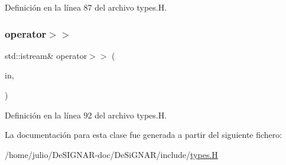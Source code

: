 Definición en la línea 87 del archivo types.\+H.

\mbox{\label{class_designar_1_1_empty_class_aa3fc576ae898cf56f66f6ebf12251803}} 
\subsubsection{\texorpdfstring{operator$>$$>$}{operator>>}}
{\footnotesize\ttfamily std\+::istream\& operator$>$$>$ (\begin{DoxyParamCaption}\item[{std\+::istream \&}]{in,  }\item[{\hyperlink{class_designar_1_1_empty_class}{Empty\+Class} \&}]{ }\end{DoxyParamCaption})\hspace{0.3cm}{\ttfamily [friend]}}



Definición en la línea 92 del archivo types.\+H.



La documentación para esta clase fue generada a partir del siguiente fichero\+:\begin{DoxyCompactItemize}
\item 
/home/julio/\+De\+S\+I\+G\+N\+A\+R-\/doc/\+De\+Si\+G\+N\+A\+R/include/\hyperlink{types_8_h}{types.\+H}\end{DoxyCompactItemize}
